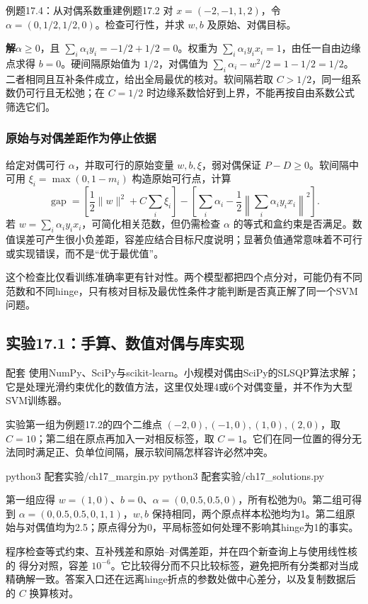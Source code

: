 \documentclass[UTF8,fontset=none,zihao=-4,a4paper]{ctexart}
\newcommand{\sol}{\par\noindent\textbf{解}\quad}
\newcommand{\code}[1]{\texttt{\detokenize{#1}}}
\numberwithin{equation}{section}
\numberwithin{figure}{section}
\begin{document}
\begin{infobox}[unbreakable]{例题17.4：从对偶系数重建例题17.2}
对 $x=(-2,-1,1,2)$，令 $\alpha=(0,1/2,1/2,0)$。检查可行性，并求 $w,b$ 及原始、对偶目标。
\sol $\alpha\ge0$，且 $\sum_i\alpha_i y_i=-1/2+1/2=0$。权重为 $\sum_i\alpha_i y_ix_i=1$，由任一自由边缘点求得 $b=0$。硬间隔原始值为 $1/2$，对偶值为 $\sum_i\alpha_i-w^2/2=1-1/2=1/2$。二者相同且互补条件成立，给出全局最优的核对。软间隔若取 $C>1/2$，同一组系数仍可行且无松弛；在 $C=1/2$ 时边缘系数恰好到上界，不能再按自由系数公式筛选它们。
\end{infobox}

\subsubsection{原始与对偶差距作为停止依据}
给定对偶可行 $\alpha$，并取可行的原始变量 $w,b,\xi$，弱对偶保证 $P-D\ge0$。软间隔中可用 $\xi_i=\max(0,1-m_i)$ 构造原始可行点，计算
\[
 \operatorname{gap}=\left[\frac12\|w\|^2+C\sum_i\xi_i\right]
 -\left[\sum_i\alpha_i-\frac12\left\|\sum_i\alpha_i y_ix_i\right\|^2\right].
\]
若 $w=\sum_i\alpha_i y_ix_i$，可简化相关范数，但仍需检查 $\alpha$ 的等式和盒约束是否满足。数值误差可产生很小负差距，容差应结合目标尺度说明；显著负值通常意味着不可行或实现错误，而不是“优于最优值”。

这个检查比仅看训练准确率更有针对性。两个模型都把四个点分对，可能仍有不同范数和不同hinge，只有核对目标及最优性条件才能判断是否真正解了同一个SVM问题。

\subsection{实验17.1：手算、数值对偶与库实现}
配套 \code{ch17_margin.py} 使用NumPy、SciPy与scikit-learn。小规模对偶由SciPy的SLSQP算法求解；它是处理光滑约束优化的数值方法，这里仅处理4或6个对偶变量，并不作为大型SVM训练器。

实验第一组为例题17.2的四个二维点 $(-2,0),(-1,0),(1,0),(2,0)$，取 $C=10$；第二组在原点再加入一对相反标签，取 $C=1$。它们在同一位置的得分无法同时满足正、负单位间隔，展示软间隔怎样容许必然冲突。
\begin{console}
python3 配套实验/ch17_margin.py
python3 配套实验/ch17_solutions.py
\end{console}
第一组应得 $w=(1,0)$、$b=0$、$\alpha=(0,0.5,0.5,0)$，所有松弛为0。第二组可得到 $\alpha=(0,0.5,0.5,0,1,1)$，$w,b$ 保持相同，两个原点样本松弛均为1。第二组原始与对偶值均为2.5；原点得分为0，平局标签如何处理不影响其hinge为1的事实。

程序检查等式约束、互补残差和原始--对偶差距，并在四个新查询上与使用线性核的 \code{SVC} 得分对照，容差 $10^{-6}$。它比较得分而不只比较标签，避免把所有分类都对当成精确解一致。答案入口还在远离hinge折点的参数处做中心差分，以及复制数据后的 $C$ 换算核对。
\end{document}
